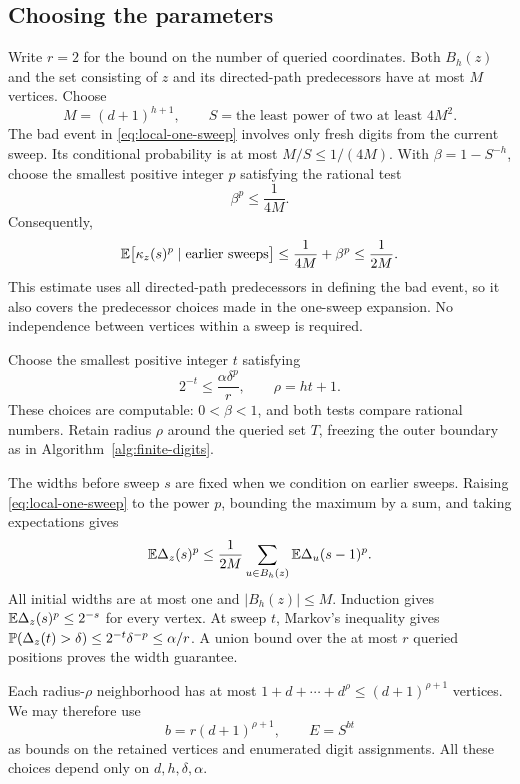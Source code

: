 \subsection{Choosing the parameters}

Write $r=2$ for the bound on the number of queried coordinates.
Both $B_h(z)$ and the set consisting of $z$ and its directed-path
predecessors have at most $M$ vertices. Choose
\begin{equation}\label{eq:digit-alphabet}
M=(d+1)^{h+1},\qquad
S=\text{the least power of two at least }4M^2.
\end{equation}
The bad event in \eqref{eq:local-one-sweep} involves only fresh digits
from the current sweep. Its conditional probability is at most
$M/S\le1/(4M)$. With $\beta=1-S^{-h}$, choose the smallest positive
integer $p$ satisfying the rational test
\begin{equation}\label{eq:moment-power}
\beta^p\le\frac1{4M}.
\end{equation}
Consequently,
\[
\mathbb E\bigl[\kappa_z(s)^p\mid\text{earlier sweeps}\bigr]
\le\frac1{4M}+\beta^p\le\frac1{2M}.
\]
This estimate uses all directed-path predecessors in defining the bad
event, so it also covers the predecessor choices made in the one-sweep
expansion. No independence between vertices within a sweep is required.

Choose the smallest positive integer $t$ satisfying
\begin{equation}\label{eq:local-radius}
2^{-t}\le\frac{\alpha\delta^p}{r},\qquad \rho=ht+1.
\end{equation}
These choices are computable: $0<\beta<1$, and both tests compare rational
numbers. Retain radius $\rho$ around the queried set $T$, freezing the
outer boundary as in Algorithm~\ref{alg:finite-digits}.

The widths before sweep $s$ are fixed when we condition on earlier
sweeps. Raising \eqref{eq:local-one-sweep} to the power $p$, bounding
the maximum by a sum, and taking expectations gives
\[
\mathbb E\Delta_z(s)^p
\le\frac1{2M}\sum_{u\in B_h(z)}\mathbb E\Delta_u(s-1)^p.
\]
All initial widths are at most one and $|B_h(z)|\le M$. Induction
gives $\mathbb E\Delta_z(s)^p\le2^{-s}$ for every vertex. At sweep $t$,
Markov's inequality gives
$\mathbb P(\Delta_z(t)>\delta)\le2^{-t}\delta^{-p}\le\alpha/r$.
A union bound over the at most $r$ queried positions proves the width
guarantee.

Each radius-$\rho$ neighborhood has at most
$1+d+\cdots+d^\rho\le(d+1)^{\rho+1}$ vertices. We may therefore use
\begin{equation}\label{eq:local-size}
b=r(d+1)^{\rho+1},\qquad E=S^{bt}
\end{equation}
as bounds on the retained vertices and enumerated digit assignments.
All these choices depend only on $d,h,\delta,\alpha$.
